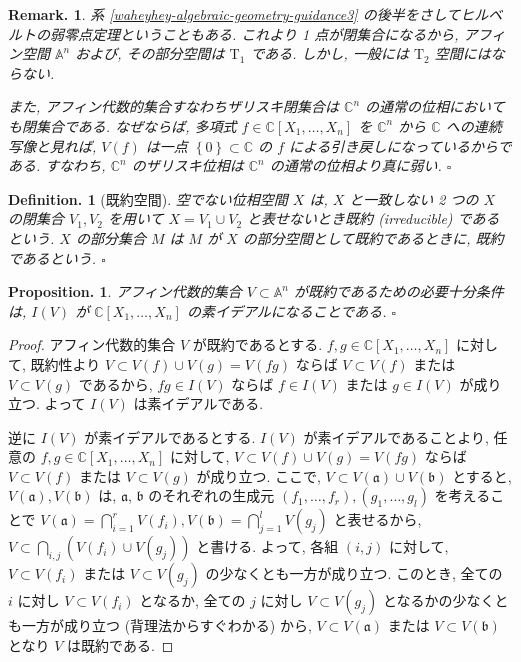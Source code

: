 \documentclass[openany, a4paper, oneside]{jsbook}
\theoremstyle{break}
\newtheorem{prop}[thm]{Proposition.}
\theoremstyle{breakdefn}
\newtheorem{defn}[thm]{Definition.}
\newtheorem{rem}[thm]{Remark.}
\newcommand{\cbk}[1]{\left\{#1\right\}}
\newcommand{\fin}{\hfill $\square$ \par}
\begin{document}
\begin{rem}
系 \ref{waheyhey-algebraic-geometry-guidance3} の後半をさしてヒルベルトの弱零点定理ということもある.
これより 1 点が閉集合になるから, アフィン空間 $\mathbb{A}^n$ および, その部分空間は $\mathrm{T}_1$ である.
しかし, 一般には $\mathrm{T}_2$ 空間にはならない.

また, アフィン代数的集合すなわちザリスキ閉集合は $\mathbb{C}^n$ の通常の位相においても閉集合である.
なぜならば, 多項式 $f \in \mathbb{C}[X_1, \dots, X_n]$ を $\mathbb{C}^n$ から $\mathbb{C}$ への連続写像と見れば,
$V ( f )$ は一点 $\cbk{0} \subset \mathbb{C}$ の $f$ による引き戻しになっているからである.
すなわち,  $\mathbb{C}^n$ のザリスキ位相は $\mathbb{C}^n$ の通常の位相より真に弱い. \fin
\end{rem}

\begin{defn}[既約空間]
空でない位相空間 $X$ は, $X$ と一致しない 2 つの $X$ の閉集合 $V_1, V_2$ を用いて $X= V_1 \cup V_2$ と表せないとき既約 (irreducible) であるという.
$X$ の部分集合 $M$ は $M$ が $X$ の部分空間として既約であるときに, 既約であるという. \fin
\end{defn}
\begin{prop}\label{waheyhey-algebraic-geometry-guidance4}
 アフィン代数的集合 $V \subset \mathbb{A}^n$ が既約であるための必要十分条件は,
 $I ( V )$ が $\mathbb{C}[X_1, \dots, X_n]$ の素イデアルになることである. \fin
\end{prop}
\begin{proof}
アフィン代数的集合 $V$ が既約であるとする.
$f, g \in \mathbb{C}[X_1, \dots, X_n]$ に対して,
既約性より $V \subset V ( f ) \cup V ( g ) = V (fg)$ ならば $V \subset V ( f )$ または $V \subset V ( g )$ であるから,
$fg \in I ( V )$ ならば $f \in I (V)$ または $g \in I (V)$ が成り立つ.
よって $I ( V )$ は素イデアルである.

逆に $I (V)$ が素イデアルであるとする.
$I (V)$ が素イデアルであることより, 任意の $ f, g \in \mathbb{C}[X_1, \dots, X_n]$ に対して,
$V \subset V ( f ) \cup V ( g ) = V (fg)$ ならば $V \subset V (f)$ または $V \subset V (g)$ が成り立つ.
ここで, $V \subset V ( \mathfrak{a} ) \cup V ( \mathfrak{b} )$ とすると,
$V ( \mathfrak{a} ), V ( \mathfrak{b} )$ は,  $\mathfrak{a}$, $\mathfrak{b}$ のそれぞれの生成元
$(f_1, \dots, f_r) , (g_1, \dots, g_l)$ を考えることで
$V ( \mathfrak{a} ) = \bigcap_{i=1}^r V ( f_i ) , V ( \mathfrak{b} ) = \bigcap_{j=1}^l V ( g_j )$ と表せるから,
$V \subset \bigcap_{i, j} \left ( V ( f_i ) \cup V (g_j) \right)$ と書ける.
よって, 各組 $( i, j )$ に対して, $V \subset V (f_i)$ または $V \subset V (g_j)$ の少なくとも一方が成り立つ.
このとき, 全ての $i$ に対し $V \subset V ( f_i)$ となるか,
全ての $j$ に対し $V \subset V ( g_j )$ となるかの少なくとも一方が成り立つ (背理法からすぐわかる) から,
$V \subset V ( \mathfrak{a} )$ または $V \subset V ( \mathfrak{b} )$ となり $V$ は既約である.
\end{proof}
\end{document}
